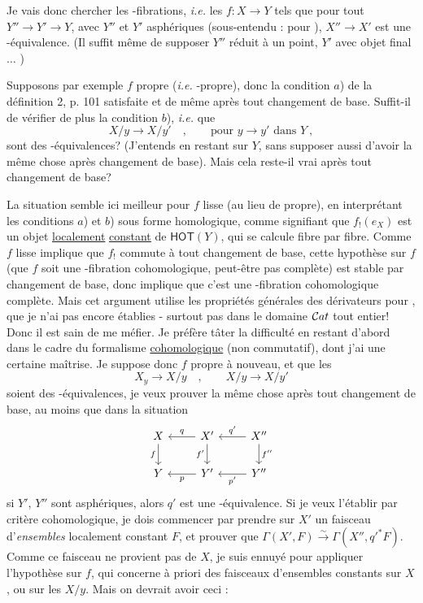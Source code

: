 Je vais donc chercher les \HOT-fibrations, \textit{i.e.} les $f : X \to Y$ tels que pour tout $Y'' \to Y' \to Y$, avec $Y''$ et $Y'$ asphériques (sous-entendu : pour \HOT), $X'' \to X'$ est une \Hot-équivalence. (Il suffit même de supposer $Y''$ réduit à un point, $Y'$ avec objet final $\ldots$ )

Supposons par exemple $f$ propre (\textit{i.e.} \HOT-propre), donc la condition $a$) de la définition 2, p. 101 satisfaite et de même après tout changement de base. Suffit-il de vérifier de plus la condition $b$), \textit{i.e.} que
\[ X/y \longrightarrow X/y' \quad , \qquad \text{pour } y \to y' \text{ dans } Y \ , \]
sont des \Hot-équivalences? (J'entends en restant sur $Y$, sans supposer aussi d'avoir la même chose après changement de base).
Mais cela reste-il vrai après tout changement de base? %

La situation semble ici meilleur pour $f$ lisse (au lieu de propre), en interprétant les conditions $a$) et $b$) sous forme homologique, comme signifiant que $f_!(e_X)$ est un objet \underline{localement} \underline{constant} de $\mathsf{HOT}(Y)$, qui se calcule fibre par fibre. Comme $f$ lisse implique que $f_!$ commute à tout changement de base, cette hypothèse sur $f$ (que $f$ soit une \HOT-fibration cohomologique, peut-être pas complète) est stable par changement de base, donc implique que c'est une \HOT-fibration cohomologique complète. Mais cet argument utilise les propriétés générales des dérivateurs pour \HOT, que je n'ai pas encore établies - surtout pas dans le domaine $\mathcal{C}at$ tout entier! Donc il est sain de me méfier. Je préfère tâter la difficulté en restant d'abord dans le cadre du formalisme \underline{cohomologique} (non commutatif), dont j'ai une certaine maîtrise. Je suppose donc $f$ propre à nouveau, et que les %
\[ X_y \longrightarrow X/y \quad , \qquad X/y \longrightarrow X/y' \]
soient des \HOT-équivalences, je veux prouver la même chose après tout changement de base, au moins que dans la situation
\[
\begin{tikzcd}
X \arrow[r, leftarrow, "q"] \arrow[d, "f"'] & X' \arrow[r, leftarrow, "q'"] \arrow[d, "f'"'] & X'' \arrow[d, "f''"] \\
Y \arrow[r, leftarrow, "p"'] & Y' \arrow[r, leftarrow, "p'"'] & Y''
\end{tikzcd}
\]
si $Y'$, $Y''$ sont asphériques, alors $q'$ est une \Hot-équivalence. Si je veux l'établir par critère cohomologique, je dois commencer par prendre sur $X'$ un faisceau d'\textit{ensembles} localement constant $F$, et prouver que $\Gamma(X',F) \overset{\sim}{\to} \Gamma(X'',{q'}^{*}F)$. Comme ce faisceau ne provient pas de $X$, je suis ennuyé pour appliquer l'hypothèse sur $f$, qui concerne à priori des faisceaux d'ensembles constants sur $X$, ou sur les $X/y$. Mais on devrait avoir ceci :

